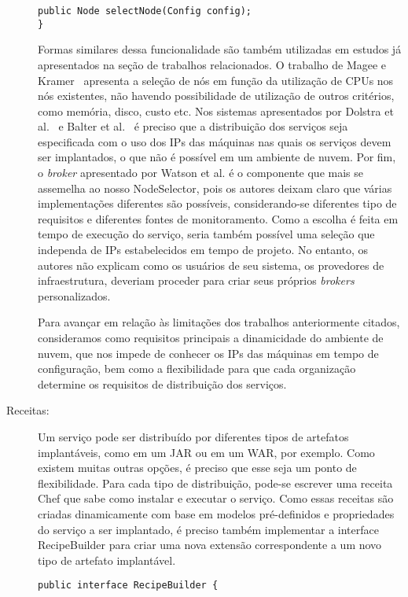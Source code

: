 \begin{description}
\begin{lstlisting}[frame=trbl, label=lst:node_selector, caption=Interface NodeSelector]
	public Node selectNode(Config config);
}
\end{lstlisting}

Formas similares dessa funcionalidade são também utilizadas em estudos já apresentados na seção de trabalhos relacionados.  O trabalho de Magee e Kramer~\cite{Magee1997Corba} apresenta a seleção de nós em função da utilização de CPUs nos nós existentes, não havendo possibilidade de utilização de outros critérios, como memória, disco, custo etc. Nos sistemas apresentados por Dolstra et al.~\cite{Dolstra2005Configuration} e Balter et al.~\cite{Balter1998Olan} é preciso que a distribuição dos serviços seja especificada com o uso dos IPs das máquinas nas quais os serviços devem ser implantados, o que não é possível em um ambiente de nuvem. Por fim, o \emph{broker} apresentado por Watson et al. é o componente que mais se assemelha ao nosso NodeSelector, pois os autores deixam claro que várias implementações diferentes são possíveis, considerando-se diferentes tipo de requisitos e diferentes fontes de monitoramento. Como a escolha é feita em tempo de execução do serviço, seria também possível uma seleção que independa de IPs estabelecidos em tempo de projeto. No entanto, os autores não explicam como os usuários de seu sistema, os provedores de infraestrutura, deveriam proceder para criar seus próprios \emph{brokers} personalizados.

Para avançar em relação às limitações dos trabalhos anteriormente citados,  consideramos como requisitos principais a dinamicidade do ambiente de nuvem, que nos impede de conhecer os IPs das máquinas em tempo de configuração, bem como a flexibilidade para que cada organização determine os requisitos de distribuição dos serviços.

\item [Receitas:]

Um serviço pode ser distribuído por diferentes tipos de artefatos implantáveis, como em um JAR ou em um WAR, por exemplo. Como existem muitas outras opções, é preciso que esse seja um ponto de flexibilidade. Para cada tipo de distribuição, pode-se escrever uma receita Chef que sabe como instalar e executar o serviço. Como essas receitas são criadas dinamicamente com base em modelos pré-definidos e propriedades do serviço a ser implantado, é preciso também implementar a interface RecipeBuilder para criar uma nova extensão correspondente a um novo tipo de artefato implantável.

\begin{lstlisting}[frame=trbl, label=lst:recipe_builder, caption=Interface RecipeBuilder]
public interface RecipeBuilder {
	

\end{lstlisting}
\end{description}
